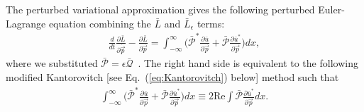 The perturbed variational approximation gives the following perturbed Euler-Lagrange equation combining the $\bar{L}$ and $\bar{L}_{\epsilon}$ terms:
\begin{align}
 \frac{d}{dt} \frac{\partial \bar{L}}{\partial \dot{\vec{p}}} - \frac{\partial \bar{L}}{\partial \vec{p}}  =  \int_{-\infty}^{\infty} \Big( \bar{\mathcal{P}}^*\frac{\partial \bar{u}}{\partial \vec{p}}  + \bar{\mathcal{P}} \frac{\partial \bar{u}^*}{\partial \vec{p}} \Big)dx,
\label{eq:pvaRHS}
\end{align}
where we substituted $\bar{\mathcal{P}} = \epsilon \bar{\mathcal{Q}}$~\cite{Malomed2002}.
The right hand side is equivalent to the following modified Kantorovitch [see Eq.~(\ref{eq:Kantorovitch}) below] method such that 
\begin{align}
  \int_{-\infty}^{\infty} \Big( \bar{\mathcal{P}}^*\frac{\partial \bar{u}}{\partial \vec{p}}  + \bar{\mathcal{P}} \frac{\partial \bar{u}^*}{\partial \vec{p}} \Big)dx \equiv 2 \mathrm{Re} \int \bar{\mathcal{P}} \frac{\partial \bar{u}^*}{\partial \vec{p}} dx.
 \end{align}

